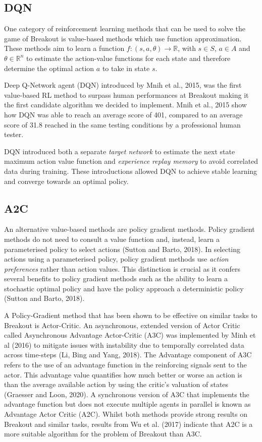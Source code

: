 \documentclass{article}
\begin{document}
\subsection{DQN}
One category of reinforcement learning methods that can be used to solve the game of Breakout is value-based methods which use function approximation.
These methods aim to learn a function $f: (s,a,\theta) \rightarrow \mathbb{R}$, with $s \in S$,  $a \in A$ and $\theta \in \mathbb{R}^n$ to estimate the action-value functions for each state and therefore determine the optimal action $a$ to take in state $s$.

Deep Q-Network agent (DQN) introduced by Mnih et al., 2015, was the first value-based RL method to surpass human performances at Breakout making it the first candidate algorithm we decided to implement.
Mnih et al., 2015 show how DQN was able to reach an average score of 401, compared to an average score of 31.8 reached in the same testing conditions by a professional human tester.

DQN introduced both a separate \emph{target network} to estimate the next state maximum action value function and \emph{experience replay memory} to avoid correlated data during training. These introductions allowed DQN to achieve stable learning and converge towards an optimal policy.

\subsection{A2C}

An alternative value-based methods are policy gradient methods. Policy gradient methods do not need to consult a value function and, instead, learn a parameterised policy to select actions (Sutton and Barto, 2018). In selecting actions using a parameterised policy, policy gradient methods use \emph{action preferences} rather than action values. This distinction is crucial as it confers several benefits to policy gradient methods such as the ability to learn a stochastic optimal policy and have the policy approach a deterministic policy (Sutton and Barto, 2018).

A Policy-Gradient method that has been shown to be effective on similar tasks to Breakout is Actor-Critic. An asynchronous, extended version of Actor Critic called Asynchronous Advantage Actor-Critic (A3C) was implemented by Minh et al (2016) to mitigate issues with instability due to temporally correlated data across time-steps (Li, Bing and Yang, 2018). The Advantage component of A3C refers to the use of an advantage function in the reinforcing signals sent to the actor. This advantage value quantifies how much better or worse an action is than the average available action by using the critic's valuation of states (Graesser and Loon, 2020). A synchronous version of A3C that implements the advantage function but does not execute multiple agents in parallel is known as Advantage Actor Critic (A2C). Whilst both methods provide strong results on Breakout and similar tasks, results from Wu et al. (2017) indicate that A2C is a more suitable algorithm for the problem of Breakout than A3C.
\end{document}
